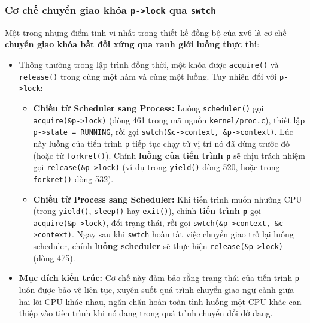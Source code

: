 \subsubsection{Cơ chế chuyển giao khóa \texttt{p->lock} qua \texttt{swtch}}
Một trong những điểm tinh vi nhất trong thiết kế đồng bộ của xv6 là cơ chế \textbf{chuyển giao khóa bất đối xứng qua ranh giới luồng thực thi}:
\begin{itemize}
    \item Thông thường trong lập trình đồng thời, một khóa được \texttt{acquire()} và \texttt{release()} trong cùng một hàm và cùng một luồng. Tuy nhiên đối với \texttt{p->lock}:
    \begin{itemize}
        \item \textbf{Chiều từ Scheduler sang Process:} Luồng \texttt{scheduler()} gọi \texttt{acquire(\&p->lock)} (dòng 461 trong mã nguồn \texttt{kernel/proc.c}), thiết lập \texttt{p->state = RUNNING}, rồi gọi \texttt{swtch(\&c->context, \&p->context)}. Lúc này luồng của tiến trình \texttt{p} tiếp tục chạy từ vị trí nó đã dừng trước đó (hoặc từ \texttt{forkret()}). Chính \textbf{luồng của tiến trình \texttt{p}} sẽ chịu trách nhiệm gọi \texttt{release(\&p->lock)} (ví dụ trong \texttt{yield()} dòng 520, hoặc trong \texttt{forkret()} dòng 532).
        \item \textbf{Chiều từ Process sang Scheduler:} Khi tiến trình muốn nhường CPU (trong \texttt{yield()}, \texttt{sleep()} hay \texttt{exit()}), chính \textbf{tiến trình \texttt{p}} gọi \texttt{acquire(\&p->lock)}, đổi trạng thái, rồi gọi \texttt{swtch(\&p->context, \&c->context)}. Ngay sau khi \texttt{swtch} hoàn tất việc chuyển giao trở lại luồng scheduler, chính \textbf{luồng scheduler} sẽ thực hiện \texttt{release(\&p->lock)} (dòng 475).
    \end{itemize}
    \item \textbf{Mục đích kiến trúc:} Cơ chế này đảm bảo rằng trạng thái của tiến trình \texttt{p} luôn được bảo vệ liên tục, xuyên suốt quá trình chuyển giao ngữ cảnh giữa hai lõi CPU khác nhau, ngăn chặn hoàn toàn tình huống một CPU khác can thiệp vào tiến trình khi nó đang trong quá trình chuyển đổi dở dang.
\end{itemize}
